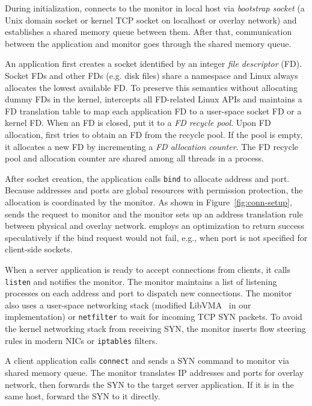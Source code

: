 During initialization, \libipc{} connects to the monitor in local host via \emph{bootstrap socket} (a Unix domain socket or kernel TCP socket on localhost or overlay network) and establishes a shared memory queue between them.
After that, communication between the application and monitor goes through the shared memory queue.

An application first creates a socket identified by an integer \emph{file descriptor} (FD).
Socket FDs and other FDs (e.g. disk files) share a namespace and Linux always allocates the lowest available FD.
To preserve this semantics without allocating dummy FDs in the kernel, \libipc{} intercepts all FD-related Linux APIs and maintains a FD translation table to map each application FD to a user-space socket FD or a kernel FD.
When an FD is closed, \libipc{} put it to a \emph{FD recycle pool}.
Upon FD allocation, \libipc{} first tries to obtain an FD from the recycle pool.
If the pool is empty, it allocates a new FD by incrementing a \emph{FD allocation counter}.
The FD recycle pool and allocation counter are shared among all threads in a process.%

After socket creation, the application calls \texttt{bind} to allocate address and port.
Because addresses and ports are global resources with permission protection, the allocation is coordinated by the monitor.
As shown in Figure~\ref{fig:conn-setup}, \libipc{} sends the request to monitor and the monitor sets up an address translation rule between physical and overlay network.
\libipc{} employs an optimization to return success speculatively if the bind request would not fail, e.g., when port is not specified for client-side sockets.

When a server application is ready to accept connections from clients, it calls \texttt{listen} and notifies the monitor.
The monitor maintains a list of listening processes on each address and port to dispatch new connections.
The monitor also uses a user-space networking stack (modified LibVMA~\cite{libvma} in our implementation) or \texttt{netfilter} to wait for incoming TCP SYN packets.
To avoid the kernel networking stack from receiving SYN, the monitor inserts flow steering rules in modern NICs or \texttt{iptables} filters.

A client application calls \texttt{connect} and sends a SYN command to monitor via shared memory queue.
The monitor translates IP addresses and ports for overlay network, then forwards the SYN to the target server application.
If it is in the same host, forward the SYN to it directly.


